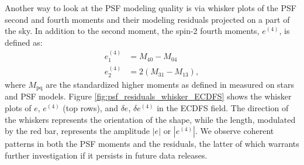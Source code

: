 Another way to look at the \gls{PSF} modeling quality is via whisker plots of the \gls{PSF} second and fourth moments and their modeling residuals projected on a part of the sky.
In addition to the second moment, the spin-2 fourth moments, $e^{(4)}$, is defined as:
\begin{align*}
e^{(4)}_1 &= M_{\text{40}} - M_{\text{04}} \\
e^{(4)}_2 &= 2\left(M_{\text{31}} - M_{\text{13}}\right),
\end{align*}
where $M_{\text{pq}}$ are the standardized higher moments as defined in \cite{2023MNRAS.520.2328Z} measured on stars and PSF models.
Figure \ref{fig:psf_residuals_whisker_ECDFS} shows
the whisker plots of $e$, $e^{(4)}$ (top rows), and $\delta e$, $\delta e^{(4)}$
in the \gls{ECDFS} field. The direction of the whiskers represents the orientation of the \gls{shape}, while the length, modulated by the red bar, represents the amplitude $|e|$ or $|e^{(4)}|$.
We observe coherent patterns in both the \gls{PSF} moments and the residuals, the latter of which warrants further investigation if it persists in future data releases.
